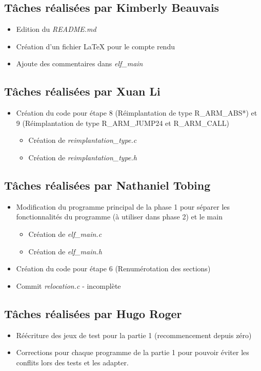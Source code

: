 \documentclass[11pt,letterpaper]{article}
\begin{document}
\subsection*{Tâches réalisées par Kimberly Beauvais}
\begin{itemize}
    \item Edition du \textit{README.md}
    \item Création d'un fichier LaTeX pour le compte rendu 
    \item Ajoute des commentaires dans \textit{elf\_main}
\end{itemize}

\subsection*{Tâches réalisées par Xuan Li}
\begin{itemize}
    \item Création du code pour étape 8 (Réimplantation de type R\_ARM\_ABS*) et 
    9 (Réimplantation de type R\_ARM\_JUMP24 et R\_ARM\_CALL) 
    \begin{itemize}
        \item Création de \textit{reimplantation\_type.c}  
        \item Création de \textit{reimplantation\_type.h} 
    \end{itemize}
\end{itemize}

\subsection*{Tâches réalisées par Nathaniel Tobing}
\begin{itemize}
    \item Modification du programme principal de la phase 1 pour séparer les 
    fonctionnalités du programme (à utiliser dans phase 2) et le main 
    \begin{itemize}
        \item Création de \textit{elf\_main.c}  
        \item Création de \textit{elf\_main.h} 
    \end{itemize}
    \item Création du code pour étape 6 (Renumérotation des sections)
    \item Commit \textit{relocation.c} - incomplète
\end{itemize}

\subsection*{Tâches réalisées par Hugo Roger}
\begin{itemize}
    \item Réécriture des jeux de test pour la partie 1 (recommencement depuis zéro)
    \item Corrections pour chaque programme de la partie 1 pour pouvoir éviter les 
    conflits lors des tests et les adapter.
\end{itemize}
\end{document}
